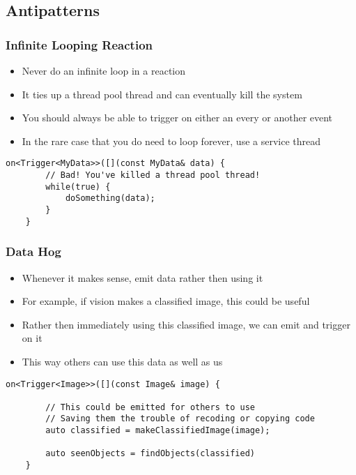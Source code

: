 \documentclass{beamer}
\begin{document}
\subsection{Antipatterns}
\begin{frame}[fragile]
	\frametitle{Infinite Looping Reaction}

	\begin{itemize}
		\item Never do an infinite loop in a reaction
		\item It ties up a thread pool thread and can eventually kill the system
		\item You should always be able to trigger on either an every or another event
		\item In the rare case that you do need to loop forever, use a service thread
	\end{itemize}

	\begin{lstlisting}[language=nuclear]
	on<Trigger<MyData>>([](const MyData& data) {
	    // Bad! You've killed a thread pool thread!
	    while(true) {
	        doSomething(data);
	    }
	}
	\end{lstlisting}
\end{frame}

\begin{frame}[fragile]
	\frametitle{Data Hog}

	\begin{itemize}
		\item Whenever it makes sense, emit data rather then using it
		\item For example, if vision makes a classified image, this could be useful
		\item Rather then immediately using this classified image, we can emit and trigger on it
		\item This way others can use this data as well as us
	\end{itemize}

	\begin{lstlisting}[language=nuclear]
	on<Trigger<Image>>([](const Image& image) {

	    // This could be emitted for others to use
	    // Saving them the trouble of recoding or copying code
	    auto classified = makeClassifiedImage(image);

	    auto seenObjects = findObjects(classified)
	}
	\end{lstlisting}
\end{frame}
\end{document}
